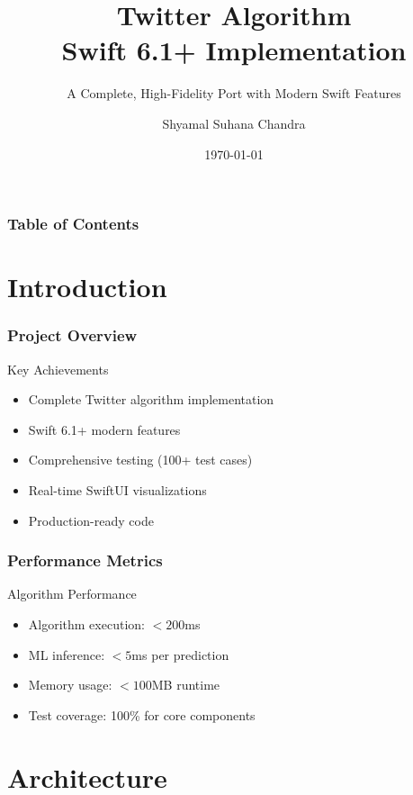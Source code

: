 \documentclass[aspectratio=169]{beamer}
\title[Twitter Algorithm Swift 6.1+]{Twitter Algorithm\\Swift 6.1+ Implementation}
\subtitle{A Complete, High-Fidelity Port with Modern Swift Features}
\author{Shyamal Suhana Chandra}
\institute{Swift 6.1+ Development}
\date{\today}
\begin{document}
\begin{frame}
    \titlepage
\end{frame}

\begin{frame}
    \frametitle{Table of Contents}
    \tableofcontents
\end{frame}

\section{Introduction}

\begin{frame}
    \frametitle{Project Overview}
    \begin{block}{Key Achievements}
        \begin{itemize}
            \item \checkmark Complete Twitter algorithm implementation
            \item \checkmark Swift 6.1+ modern features
            \item \checkmark Comprehensive testing (100+ test cases)
            \item \checkmark Real-time SwiftUI visualizations
            \item \checkmark Production-ready code
        \end{itemize}
    \end{block}
\end{frame}

\begin{frame}
    \frametitle{Performance Metrics}
    \begin{block}{Algorithm Performance}
        \begin{itemize}
            \item Algorithm execution: $< 200$ms
            \item ML inference: $< 5$ms per prediction
            \item Memory usage: $< 100$MB runtime
            \item Test coverage: 100\% for core components
        \end{itemize}
    \end{block}
\end{frame}

\section{Architecture}
\end{document}
